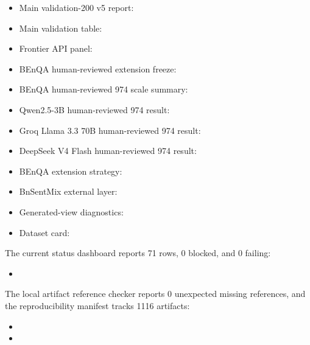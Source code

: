 \begin{itemize}
\item Main validation-200 v5 report:

\item Main validation table:

\item Frontier API panel:

\item BEnQA human-reviewed extension freeze:

\item BEnQA human-reviewed 974 scale summary:

\item Qwen2.5-3B human-reviewed 974 result:

\item Groq Llama 3.3 70B human-reviewed 974 result:

\item DeepSeek V4 Flash human-reviewed 974 result:

\item BEnQA extension strategy:

\item BnSentMix external layer:

\item Generated-view diagnostics:

\item Dataset card:

\end{itemize}

The current status dashboard reports 71 rows, 0 blocked, and 0 failing:

\begin{itemize}
\item {}
\end{itemize}

The local artifact reference checker reports 0 unexpected missing references, and the reproducibility manifest tracks 1116 artifacts:

\begin{itemize}
\item {}
\item {}
\end{itemize}

\endinput
